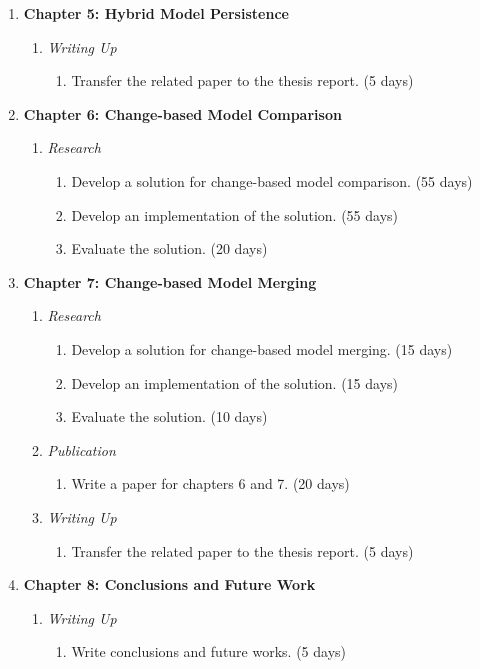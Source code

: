 \documentclass[12pt, a4paper]{report} \usepackage[titletoc]{appendix}
\begin{document}
\begin{enumerate}
\begin{enumerate}
    \end{enumerate}
    \item \textbf{Chapter 5: Hybrid Model Persistence}
    \begin{enumerate}
        \item \textit{Writing Up}
        \begin{enumerate}
            \item Transfer the related paper to the thesis report. (5 days)
        \end{enumerate}
    \end{enumerate}
    \item \textbf{Chapter 6: Change-based Model Comparison}
    \begin{enumerate}
        \item \textit{Research}
        \begin{enumerate}
            \item Develop a solution for change-based model comparison. (55 days)
            \item Develop an implementation of the solution. (55 days)
            \item Evaluate the solution. (20 days)
        \end{enumerate}
    \end{enumerate}
    \item \textbf{Chapter 7: Change-based Model Merging}
    \begin{enumerate}
        \item \textit{Research}
        \begin{enumerate}
            \item Develop a solution for change-based model merging. (15 days)
            \item Develop an implementation of the solution. (15 days)
            \item Evaluate the solution. (10 days)
        \end{enumerate}
        \item \textit{Publication}
        \begin{enumerate}
            \item Write a paper for chapters 6 and 7. (20 days)
        \end{enumerate}
        \item \textit{Writing Up}
        \begin{enumerate}
            \item Transfer the related paper to the thesis report. (5 days)
        \end{enumerate}
    \end{enumerate}
    \item \textbf{Chapter 8: Conclusions and Future Work}
    \begin{enumerate}
        \item \textit{Writing Up}
        \begin{enumerate}
            \item Write conclusions and future works. (5 days)
        \end{enumerate}
    \end{enumerate}
\end{enumerate}
\end{document}
